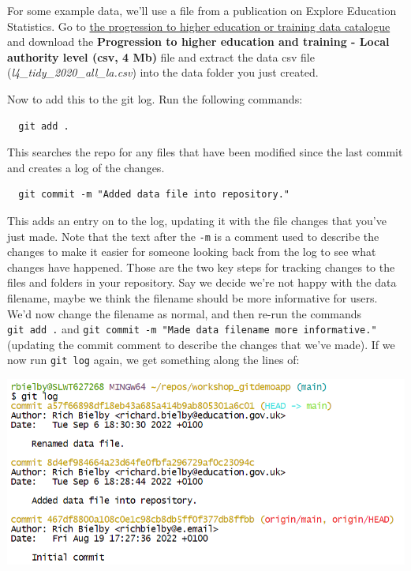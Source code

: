 \documentclass[
  12pt,
]{article}
\begin{document}
For some example data, we'll use a file from a publication on Explore
Education Statistics. Go to
\href{https://explore-education-statistics.service.gov.uk/data-catalogue/progression-to-higher-education-or-training/2019-20}{the
progression to higher education or training data catalogue} and download
the \textbf{Progression to higher education and training - Local
authority level (csv, 4 Mb)} file and extract the data csv file
(\emph{l4\_tidy\_2020\_all\_la.csv}) into the data folder you just
created.

Now to add this to the git log. Run the following commands:

\begin{verbatim}
  git add .
\end{verbatim}

This searches the repo for any files that have been modified since the
last commit and creates a log of the changes.

\begin{verbatim}
  git commit -m "Added data file into repository."
\end{verbatim}

This adds an entry on to the log, updating it with the file changes that
you've just made. Note that the text after the \texttt{-m} is a comment
used to describe the changes to make it easier for someone looking back
from the log to see what changes have happened. Those are the two key
steps for tracking changes to the files and folders in your repository.
Say we decide we're not happy with the data filename, maybe we think the
filename should be more informative for users. We'd now change the
filename as normal, and then re-run the commands \texttt{git\ add\ .}
and \texttt{git\ commit\ -m\ "Made\ data\ filename\ more\ informative."}
(updating the commit comment to describe the changes that we've made).
If we now run \texttt{git\ log} again, we get something along the lines
of:

\begin{center}\includegraphics[width=0.8\linewidth]{images/gitdemo/gitdemo-gitlog-2} \end{center}
\end{document}
